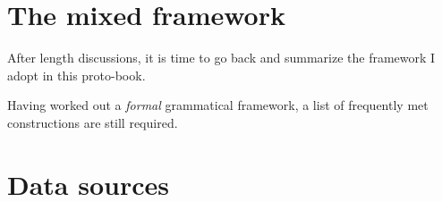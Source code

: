 \documentclass[../main.tex]{subfiles}
\begin{document}
\section{The mixed framework}


After length discussions, it is time to go back and summarize the framework I adopt in this proto-book.

Having worked out a \emph{formal} grammatical framework, a list of frequently met constructions 
are still required. 


\section{Data sources}

\end{document}
